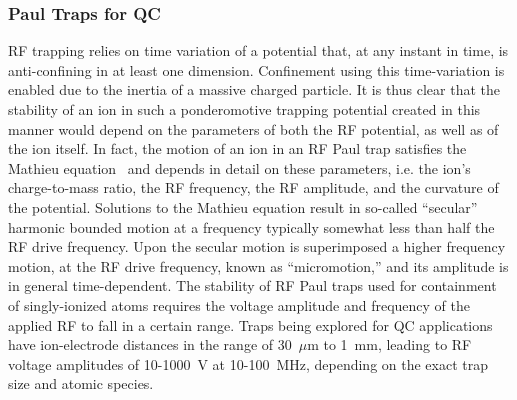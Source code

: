 \documentclass[%
reprint,
 amsmath,amssymb,
]{revtex4-1}
\begin{document}
\subsubsection{Paul Traps for QC}


RF trapping relies on time variation of a potential that, at any instant in time, is anti-confining in at least one dimension.  Confinement using this time-variation is enabled due to the inertia of a massive charged particle.  It is thus clear that the stability of an ion in such a ponderomotive trapping potential created in this manner would depend on the parameters of both the RF potential, as well as of the ion itself.  In fact, the motion of an ion in an RF Paul trap satisfies the Mathieu equation~\cite{Wineland1998} and depends in detail on these parameters, i.e. the ion's charge-to-mass ratio, the RF frequency, the RF amplitude, and the curvature of the potential.  Solutions to the Mathieu equation result in so-called ``secular'' harmonic bounded motion at a frequency typically  somewhat less than half the RF drive frequency.  Upon the secular motion is superimposed a higher frequency motion, at the RF drive frequency, known as ``micromotion,'' and its amplitude is in general time-dependent.  The stability of RF Paul traps used for containment of singly-ionized atoms requires the voltage amplitude and frequency of the applied RF to fall in a certain range.  Traps being explored for QC applications have ion-electrode distances in the range of 30~$\mu$m to 1~mm, leading to RF voltage amplitudes of 10-1000~V at 10-100~MHz, depending on the exact trap size and atomic species.
\end{document}
